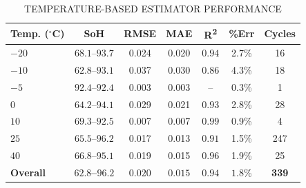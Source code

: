 \begin{table}[H]
    \caption{TEMPERATURE-BASED ESTIMATOR PERFORMANCE}
    \label{tab:temp_results}
    \begin{center}
        \footnotesize
        \begin{tabular}{@{}lcccccc@{}}
            \hline
            \textbf{Temp. ($^{\circ}$C)} & \textbf{SoH} & \textbf{RMSE} & \textbf{MAE} & \textbf{R\textsuperscript{2}} & \textbf{\%Err} & \textbf{Cycles} \\
            \hline
$-20$ & $68.1$--$93.7$ & 0.024 & 0.020 & $0.94$ & 2.7\% & 16 \\
$-10$ & $62.8$--$93.1$ & 0.037 & 0.030 & $0.86$ & 4.3\% & 18 \\
$-5$ & $92.4$--$92.4$ & 0.003 & 0.003 & -- & 0.3\% & 1 \\
$0$ & $64.2$--$94.1$ & 0.029 & 0.021 & $0.93$ & 2.8\% & 28 \\
$10$ & $69.3$--$92.5$ & 0.007 & 0.007 & $0.99$ & 0.9\% & 4 \\
$25$ & $65.5$--$96.2$ & 0.017 & 0.013 & $0.91$ & 1.5\% & 247 \\
$40$ & $66.8$--$95.1$ & 0.019 & 0.015 & $0.96$ & 1.9\% & 25 \\
            \hline
\textbf{Overall} & \textbf{$62.8$--$96.2$} & $\mathbf{0.020}$ & $\mathbf{0.015}$ & $\mathbf{0.94}$ & $\mathbf{1.8\%}$ & \textbf{339} \\
            \hline
        \end{tabular}
    \end{center}
\end{table}
